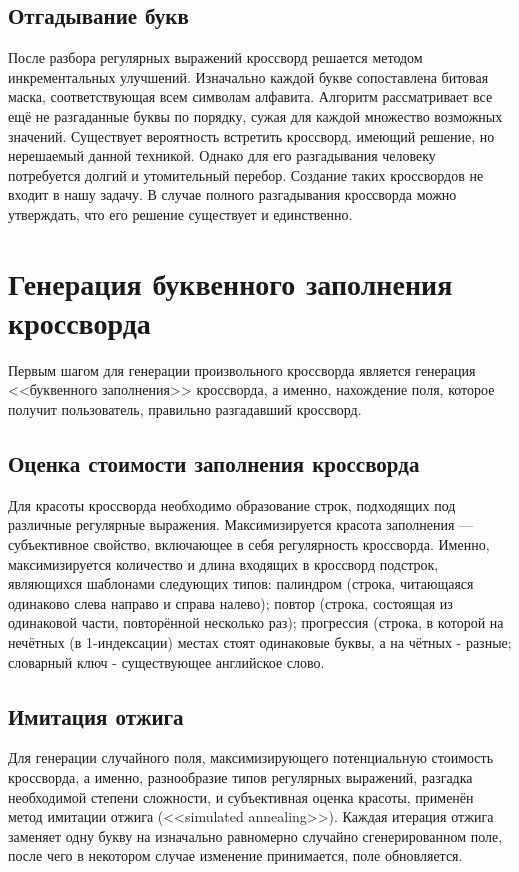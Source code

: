 \documentclass[12pt]{report}
\begin{document}
\subsection{Отгадывание букв} После разбора регулярных выражений кроссворд решается методом инкрементальных улучшений. Изначально каждой букве сопоставлена битовая маска, соответствующая всем символам алфавита. Алгоритм рассматривает все ещё не разгаданные буквы по порядку, сужая для каждой множество возможных значений. Существует вероятность встретить кроссворд, имеющий решение, но нерешаемый данной техникой. Однако для его разгадывания человеку потребуется долгий и утомительный перебор. Создание таких кроссвордов не входит в нашу задачу. В случае полного разгадывания кроссворда можно утверждать, что его решение существует и единственно.


\section{Генерация буквенного заполнения кроссворда}
Первым шагом для генерации произвольного кроссворда является генерация <<буквенного заполнения>> кроссворда, а именно, нахождение поля, которое получит пользователь, правильно разгадавший кроссворд.

\subsection{Оценка стоимости заполнения кроссворда}
Для красоты кроссворда необходимо образование строк, подходящих под различные регулярные выражения. Максимизируется красота заполнения — субъективное свойство, включающее в себя регулярность кроссворда. Именно, максимизируется количество и длина входящих в кроссворд подстрок, являющихся шаблонами следующих типов: палиндром (строка, читающаяся одинаково слева направо и справа налево); повтор (строка, состоящая из одинаковой части, повторённой несколько раз); прогрессия (строка, в которой на нечётных (в 1-индексации) местах стоят одинаковые буквы, а на чётных - разные; словарный ключ - существующее английское слово.

\subsection{Имитация отжига} Для генерации случайного поля, максимизирующего потенциальную стоимость кроссворда, а именно, разнообразие типов регулярных выражений, разгадка необходимой степени сложности, и субъективная оценка красоты, применён метод имитации отжига (<<simulated annealing>>). Каждая итерация отжига заменяет одну букву на изначально равномерно случайно сгенерированном поле, после чего в некотором случае изменение принимается, поле обновляется.
\end{document}
